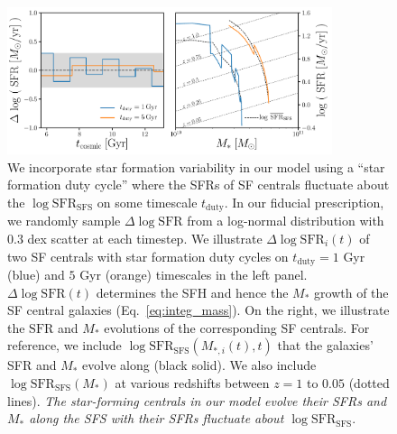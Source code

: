 \documentclass[12pt, letterpaper, preprint, tighten]{aastex62}
\newcommand{\logsfr}{\log\mathrm{SFR}}
\newcommand{\logsfrsfs}{\log\mathrm{SFR}_\mathrm{SFS}}
\begin{document}
\begin{figure}
\begin{center}
\includegraphics[width=0.85\textwidth]{figs/sfh_pedagogical.pdf}
    \caption{We incorporate star formation variability in our model using a
    ``star formation duty cycle'' where the SFRs of SF centrals fluctuate about
    the $\logsfrsfs$ on some timescale $t_\mathrm{duty}$. In our fiducial
    prescription, we randomly sample $\Delta \logsfr$ from a log-normal
    distribution with $0.3$ dex scatter at each timestep. We illustrate
    $\Delta\logsfr_i(t)$ of two SF centrals with star formation duty cycles
    on $t_\mathrm{duty} = 1$ Gyr (blue) and $5$ Gyr (orange) timescales
    in the left panel. $\Delta \logsfr(t)$ determines the SFH and hence
    the $M_*$ growth of the SF central galaxies (Eq.~\ref{eq:integ_mass}).
    On the right, we illustrate the $\mathrm{SFR}$ and $M_*$ evolutions
    of the corresponding SF centrals. For reference, we include
    $\logsfrsfs(M_{*,i}(t), t)$ that the galaxies' SFR and $M_*$ evolve along
    (black solid). We also include $\logsfrsfs(M_*)$ at various redshifts
    between $z = 1$ to $0.05$ (dotted  lines). \emph{The star-forming
    centrals in our model evolve their SFRs and $M_*$ along the SFS
    with their SFRs fluctuate about $\logsfrsfs$}.} \label{fig:sfh_model}
\end{center}
\end{figure}
\end{document}
